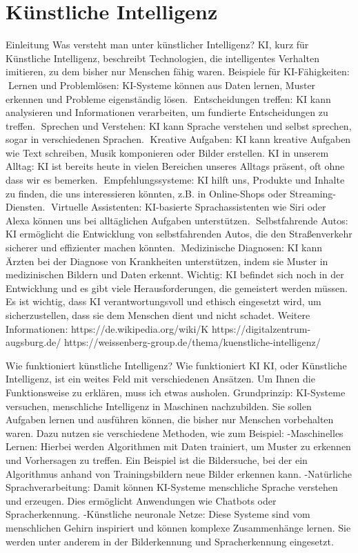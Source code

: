 \section{Künstliche Intelligenz}
\label{sec:ai}

Einleitung
Was versteht man unter künstlicher Intelligenz?
KI, kurz für Künstliche Intelligenz, beschreibt Technologien, die intelligentes Verhalten imitieren, zu dem bisher nur Menschen fähig waren.
Beispiele für KI-Fähigkeiten:
Lernen und Problemlösen: KI-Systeme können aus Daten lernen, Muster erkennen und Probleme eigenständig lösen.
Entscheidungen treffen: KI kann analysieren und Informationen verarbeiten, um fundierte Entscheidungen zu treffen.
Sprechen und Verstehen: KI kann Sprache verstehen und selbst sprechen, sogar in verschiedenen Sprachen.
Kreative Aufgaben: KI kann kreative Aufgaben wie Text schreiben, Musik komponieren oder Bilder erstellen.
KI in unserem Alltag:
KI ist bereits heute in vielen Bereichen unseres Alltags präsent, oft ohne dass wir es bemerken.
Empfehlungssysteme: KI hilft uns, Produkte und Inhalte zu finden, die uns interessieren könnten, z.B. in Online-Shops oder Streaming-Diensten.
Virtuelle Assistenten: KI-basierte Sprachassistenten wie Siri oder Alexa können uns bei alltäglichen Aufgaben unterstützen.
Selbstfahrende Autos: KI ermöglicht die Entwicklung von selbstfahrenden Autos, die den Straßenverkehr sicherer und effizienter machen könnten.
Medizinische Diagnosen: KI kann Ärzten bei der Diagnose von Krankheiten unterstützen, indem sie Muster in medizinischen Bildern und Daten erkennt.
Wichtig: KI befindet sich noch in der Entwicklung und es gibt viele Herausforderungen, die gemeistert werden müssen.
Es ist wichtig, dass KI verantwortungsvoll und ethisch eingesetzt wird, um sicherzustellen, dass sie dem Menschen dient und nicht schadet.
Weitere Informationen:
https://de.wikipedia.org/wiki/K%
https://digitalzentrum-augsburg.de/
https://weissenberg-group.de/thema/kuenstliche-intelligenz/


Wie funktioniert künstliche Intelligenz?
Wie funktioniert KI
KI, oder Künstliche Intelligenz, ist ein weites Feld mit verschiedenen Ansätzen. Um Ihnen die Funktionsweise zu erklären, muss ich etwas ausholen.
Grundprinzip:
KI-Systeme versuchen, menschliche Intelligenz in Maschinen nachzubilden. Sie sollen Aufgaben lernen und ausführen können, die bisher nur Menschen vorbehalten waren. Dazu nutzen sie verschiedene Methoden, wie zum Beispiel:
-Maschinelles Lernen: Hierbei werden Algorithmen mit Daten trainiert, um Muster zu erkennen und Vorhersagen zu treffen. Ein Beispiel ist die Bildersuche, bei der ein Algorithmus anhand von Trainingsbildern neue Bilder erkennen kann.
-Natürliche Sprachverarbeitung: Damit können KI-Systeme menschliche Sprache verstehen und erzeugen. Dies ermöglicht Anwendungen wie Chatbots oder Spracherkennung.
-Künstliche neuronale Netze: Diese Systeme sind vom menschlichen Gehirn inspiriert und können komplexe Zusammenhänge lernen. Sie werden unter anderem in der Bilderkennung und Spracherkennung eingesetzt.

